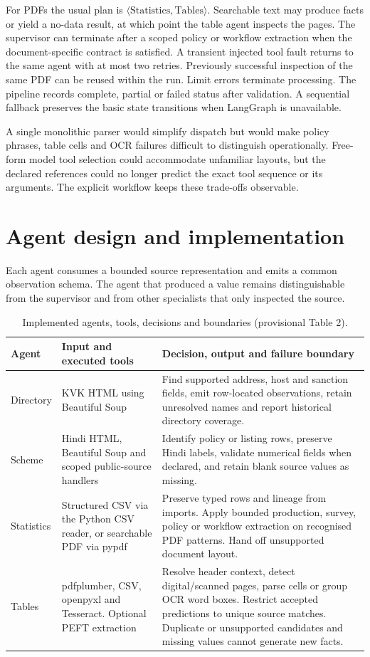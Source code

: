 \documentclass[11pt,a4paper]{article}
\begin{document}
For PDFs the usual plan is \(\langle\mathrm{Statistics},\mathrm{Tables}\rangle\). Searchable text may produce facts or yield a no-data result, at which point the table agent inspects the pages. The supervisor can terminate after a scoped policy or workflow extraction when the document-specific contract is satisfied. A transient injected tool fault returns to the same agent with at most two retries. Previously successful inspection of the same PDF can be reused within the run. Limit errors terminate processing. The pipeline records complete, partial or failed status after validation. A sequential fallback preserves the basic state transitions when LangGraph is unavailable.

A single monolithic parser would simplify dispatch but would make policy phrases, table cells and OCR failures difficult to distinguish operationally. Free-form model tool selection could accommodate unfamiliar layouts, but the declared references could no longer predict the exact tool sequence or its arguments. The explicit workflow keeps these trade-offs observable.

\clearpage
\section{Agent design and implementation}
Each agent consumes a bounded source representation and emits a common observation schema. The agent that produced a value remains distinguishable from the supervisor and from other specialists that only inspected the source.

\begin{table}[!ht]
\small
\caption{Implemented agents, tools, decisions and boundaries (provisional Table 2).}
\label{tab:agents}
\begin{tabularx}{\linewidth}{@{}P{.14\linewidth}P{.25\linewidth}Y@{}}
\toprule
Agent & Input and executed tools & Decision, output and failure boundary\\
\midrule
Directory & KVK HTML using Beautiful Soup & Find supported address, host and sanction fields, emit row-located observations, retain unresolved names and report historical directory coverage.\\
Scheme & Hindi HTML, Beautiful Soup and scoped public-source handlers & Identify policy or listing rows, preserve Hindi labels, validate numerical fields when declared, and retain blank source values as missing.\\
Statistics & Structured CSV via the Python CSV reader, or searchable PDF via pypdf & Preserve typed rows and lineage from imports. Apply bounded production, survey, policy or workflow extraction on recognised PDF patterns. Hand off unsupported document layout.\\
Tables & pdfplumber, CSV, openpyxl and Tesseract. Optional PEFT extraction & Resolve header context, detect digital/scanned pages, parse cells or group OCR word boxes. Restrict accepted predictions to unique source matches. Duplicate or unsupported candidates and missing values cannot generate new facts.\\
\bottomrule
\end{tabularx}
\end{table}
\end{document}
